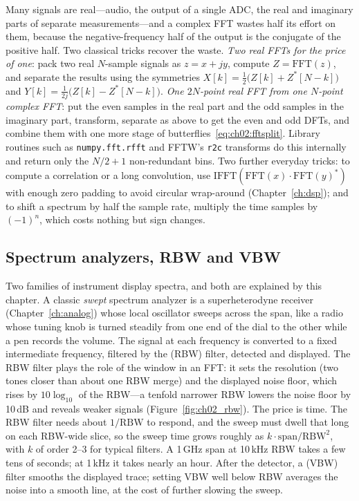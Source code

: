 \begin{inpractice}
Many signals are real---audio, the output of a single ADC, the real and imaginary parts of separate
measurements---and a complex FFT wastes half its effort on them, because the negative-frequency half
of the output is the conjugate of the positive half. Two classical tricks recover the waste.
\emph{Two real FFTs for the price of one}: pack two real $N$-sample signals as $z=x+jy$, compute
$Z=\mathrm{FFT}(z)$, and separate the results using the symmetries
$X[k]=\tfrac12\big(Z[k]+Z^*[N-k]\big)$ and $Y[k]=\tfrac1{2j}\big(Z[k]-Z^*[N-k]\big)$. \emph{One
$2N$-point real FFT from one $N$-point complex FFT}: put the even samples in the real part and the odd
samples in the imaginary part, transform, separate as above to get the even and odd DFTs, and combine
them with one more stage of butterflies~\eqref{eq:ch02:fftsplit}. Library routines such as
\texttt{numpy.fft.rfft} and FFTW's \texttt{r2c} transforms do this internally and return only the
$N/2+1$ non-redundant bins. Two further everyday tricks: to compute a correlation or a long
convolution, use $\mathrm{IFFT}(\mathrm{FFT}(x)\cdot\mathrm{FFT}(y)^*)$ with enough zero padding to
avoid circular wrap-around (Chapter~\ref{ch:dsp}); and to shift a spectrum by half the sample rate,
multiply the time samples by $(-1)^n$, which costs nothing but sign changes.
\end{inpractice}

\subsection{Spectrum analyzers, RBW and VBW}

Two families of instrument display spectra, and both are explained by this chapter. A classic
\emph{swept} spectrum analyzer is a superheterodyne receiver (Chapter~\ref{ch:analog}) whose local
oscillator sweeps across the span, like a radio whose tuning knob is turned steadily from one end of
the dial to the other while a pen records the volume. The signal at each frequency is converted to a
fixed intermediate frequency, filtered by the  (RBW) filter, detected and
displayed. The RBW filter plays the role of the window in an FFT: it sets the resolution (two tones
closer than about one RBW merge) and the displayed noise floor, which rises by $10\log_{10}$ of the
RBW---a tenfold narrower RBW lowers the noise floor by 10\,dB and reveals weaker signals
(Figure~\ref{fig:ch02_rbw}). The price is time. The RBW filter needs about $1/\text{RBW}$ to respond,
and the sweep must dwell that long on each RBW-wide slice, so the sweep time grows roughly as
$k\cdot\text{span}/\text{RBW}^2$, with $k$ of order 2--3 for typical filters. A 1\,GHz span at
10\,kHz RBW takes a few tens of seconds; at 1\,kHz it takes nearly an hour. After the detector, a
 (VBW) filter smooths the displayed trace; setting VBW well below RBW averages
the noise into a smooth line, at the cost of further slowing the sweep.

